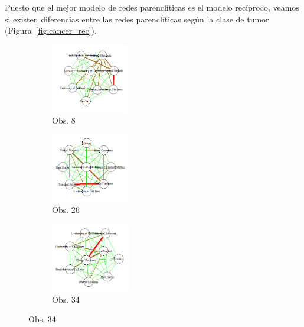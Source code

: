 Puesto que el mejor modelo de redes parenclíticas es el modelo recíproco, veamos si existen diferencias entre las redes parenclíticas según la clase de tumor (Figura~\ref{fig:cancer_rec}).\\

\begin{figure}[htbp!]
	\begin{center}
		\begin{subfigure}[t]{0.25\textwidth}
			\centering
			\includegraphics[height=3cm]{imagenes/cancer/b1_reciproco.png}
			\caption{Obs. 8}
		\end{subfigure}
		\begin{subfigure}[t]{0.25\textwidth}
			\centering
			\includegraphics[height=3cm]{imagenes/cancer/b2_reciproco.png}
			\caption{Obs. 26}
		\end{subfigure}
		\begin{subfigure}[t]{0.25\textwidth}
			\centering
			\includegraphics[height=3cm]{imagenes/cancer/b3_reciproco.png}
			\caption{Obs. 34}
		\end{subfigure}
		

\end{center}
\end{figure}
